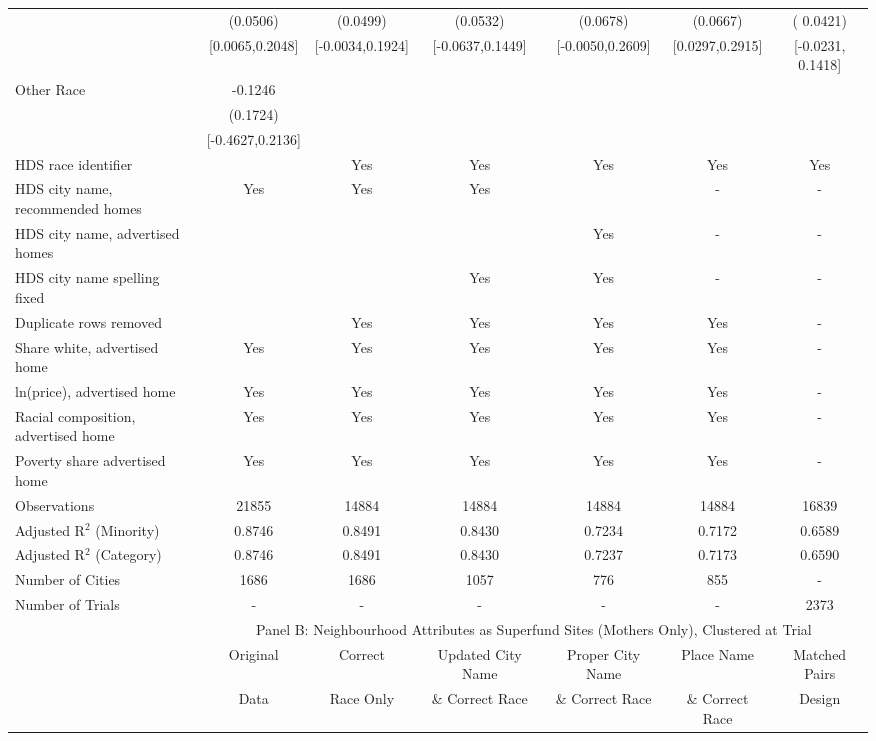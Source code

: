 \begin{table}[htbp]
{\begin{tabular}{l*{6}{c}}
 & (0.0506) & (0.0499) & (0.0532) & (0.0678) & (0.0667) & ( 0.0421) \\
 & [0.0065,0.2048] & [-0.0034,0.1924] & [-0.0637,0.1449] & [-0.0050,0.2609] & [0.0297,0.2915] & [-0.0231,  0.1418] \\
Other Race & -0.1246 &  &  &  &  &  \\
 & (0.1724) &  &  &  &  &  \\
 & [-0.4627,0.2136] &  &  &  &  &  \\
\midrule
HDS race identifier & & Yes & Yes & Yes & Yes & Yes \\
HDS city name, recommended homes & Yes & Yes & Yes & & - & -\\
HDS city name, advertised homes &  &  &  & Yes & - & -\\
HDS city name spelling fixed & & & Yes & Yes & - & -\\
Duplicate rows removed &  & Yes & Yes & Yes & Yes & - \\
\midrule
Share white, advertised home  & Yes & Yes & Yes & Yes & Yes & - \\
ln(price), advertised home  & Yes & Yes & Yes & Yes & Yes & - \\
Racial composition, advertised home & Yes & Yes & Yes & Yes & Yes & - \\
Poverty share advertised home & Yes & Yes & Yes & Yes & Yes & - \\
Observations & 21855 & 14884 & 14884 & 14884 & 14884 & 16839 \\
Adjusted R$^2$ (Minority) & 0.8746 & 0.8491 & 0.8430 & 0.7234 & 0.7172 & 0.6589 \\
Adjusted R$^2$ (Category) & 0.8746 & 0.8491 & 0.8430 & 0.7237 & 0.7173 & 0.6590 \\
Number of Cities & 1686 & 1686 & 1057 & 776 & 855 & - \\
Number of Trials & - & - & - & - & - & 2373 \\
\bottomrule
\toprule
& \multicolumn{6}{c}{Panel B: Neighbourhood Attributes as Superfund Sites (Mothers Only), Clustered at Trial}\\
\toprule
                    &\multicolumn{1}{c}{Original}&\multicolumn{1}{c}{Correct}&\multicolumn{1}{c}{Updated City Name}&\multicolumn{1}{c}{Proper City Name}&\multicolumn{1}{c}{Place Name}&\multicolumn{1}{c}{Matched Pairs}\\
                      &\multicolumn{1}{c}{Data}&\multicolumn{1}{c}{Race Only}&\multicolumn{1}{c}{\& Correct Race}&\multicolumn{1}{c}{\& Correct Race}&\multicolumn{1}{c}{\& Correct Race}&\multicolumn{1}{c}{Design}\\                  

\end{tabular}}
\end{table}
